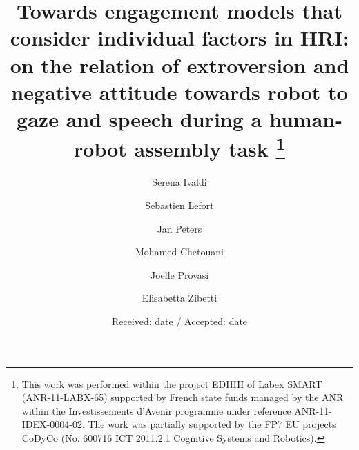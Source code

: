 \documentclass[twocolumn]{svjour3}          %
\begin{document}
\title{
Towards engagement models that consider individual factors in HRI: on the relation of extroversion and negative attitude towards robot to gaze and speech during a human-robot assembly task
\thanks
{This work was performed within the project EDHHI of Labex SMART (ANR-11-LABX-65) supported by French state funds managed by the ANR within the Investissements d'Avenir programme under reference  ANR-11-IDEX-0004-02. The work was partially supported by the FP7 EU projects CoDyCo (No. 600716 ICT 2011.2.1 Cognitive Systems and Robotics).}
}


\author{
        Serena Ivaldi \and Sebastien Lefort \and Jan Peters \and Mohamed Chetouani \and Joelle Provasi \and Elisabetta Zibetti
}



\date{Received: date / Accepted: date}


\maketitle
\end{document}
